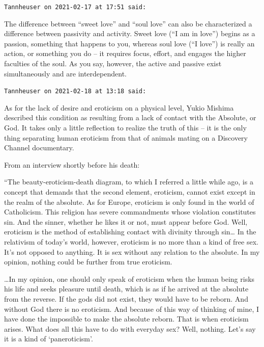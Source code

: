 \begin{footnotesize}\begin{sffamily}



\texttt{Tannheuser on 2021-02-17 at 17:51 said: }

The difference between “sweet love” and “soul love” can also be characterized a difference between passivity and activity. Sweet love (“I am in love”) begins as a passion, something that happens to you, whereas soul love (“I love”) is really an action, or something you do – it requires focus, effort, and engages the higher faculties of the soul. As you say, however, the active and passive exist simultaneously and are interdependent.


\hfill

\texttt{Tannheuser on 2021-02-18 at 13:18 said: }

As for the lack of desire and eroticism on a physical level, Yukio Mishima described this condition as resulting from a lack of contact with the Absolute, or God. It takes only a little reflection to realize the truth of this – it is the only thing separating human eroticism from that of animals mating on a Discovery Channel documentary.

From an interview shortly before his death:

“The beauty-eroticism-death diagram, to which I referred a little while ago, is a concept that demands that the second element, eroticism, cannot exist except in the realm of the absolute. As for Europe, eroticism is only found in the world of Catholicism. This religion has severe commandments whose violation constitutes sin. And the sinner, whether he likes it or not, must appear before God. Well, eroticism is the method of establishing contact with divinity through sin… In the relativism of today's world, however, eroticism is no more than a kind of free sex. It's not opposed to anything. It is sex without any relation to the absolute. In my opinion, nothing could be further from true eroticism.

…In my opinion, one should only speak of eroticism when the human being risks his life and seeks pleasure until death, which is as if he arrived at the absolute from the reverse. If the gods did not exist, they would have to be reborn. And without God there is no eroticism. And because of this way of thinking of mine, I have done the impossible to make the absolute reborn. That is when eroticism arises. What does all this have to do with everyday sex? Well, nothing. Let's say it is a kind of `paneroticism'.


\end{sffamily}
\end{footnotesize}
